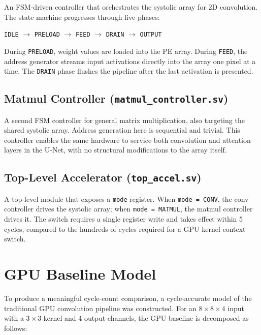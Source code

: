 \documentclass[11pt, letterpaper]{article}
\begin{document}
An FSM-driven controller that orchestrates the systolic array for 2D
convolution. The state machine progresses through five phases:

\begin{center}
\texttt{IDLE} $\to$ \texttt{PRELOAD} $\to$ \texttt{FEED} $\to$
\texttt{DRAIN} $\to$ \texttt{OUTPUT}
\end{center}

During \texttt{PRELOAD}, weight values are loaded into the PE array. During
\texttt{FEED}, the address generator streams input activations directly into
the array one pixel at a time. The \texttt{DRAIN} phase flushes the pipeline
after the last activation is presented.

\subsection{Matmul Controller (\texttt{matmul\_controller.sv})}

A second FSM controller for general matrix multiplication, also targeting the
shared systolic array. Address generation here is sequential and trivial.
This controller enables the same hardware to service both convolution and
attention layers in the U-Net, with no structural modifications to the array
itself.

\subsection{Top-Level Accelerator (\texttt{top\_accel.sv})}

A top-level module that exposes a \texttt{mode} register. When
\texttt{mode = CONV}, the conv controller drives the systolic array; when
\texttt{mode = MATMUL}, the matmul controller drives it. The switch requires
a single register write and takes effect within 5 cycles, compared to the
hundreds of cycles required for a GPU kernel context switch.

\section{GPU Baseline Model}

To produce a meaningful cycle-count comparison, a cycle-accurate model of the
traditional GPU convolution pipeline was constructed. For an
$8 \times 8 \times 4$ input with a $3 \times 3$ kernel and 4 output channels,
the GPU baseline is decomposed as follows:
\end{document}
